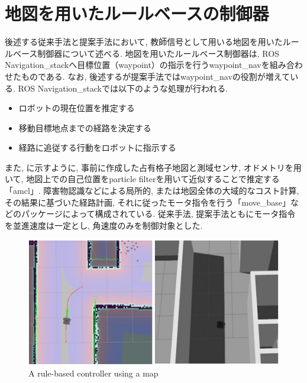 
\section{地図を用いたルールベースの制御器}
後述する従来手法と提案手法において, 教師信号として用いる地図を用いたルールベース制御器について述べる. 地図を用いたルールベース制御器は, ROS Navigation\_stack\cite{navigation:online}へ目標位置（waypoint）の指示を行うwaypoint\_nav\cite{waypoint_nav:online}を組み合わせたものである. なお, 後述するが提案手法ではwaypoint\_navの役割が増えている. ROS Navigation\_stackでは以下のような処理が行われる. 

\begin{itemize}
  \item ロボットの現在位置を推定する
  \item 移動目標地点までの経路を決定する
  \item 経路に追従する行動をロボットに指示する
\end{itemize}

また, に示すように, 事前に作成した占有格子地図と測域センサ, オドメトリを用いて, 地図上での自己位置をparticle filterを用いて近似することで推定する「amcl」. 障害物認識などによる局所的, または地図全体の大域的なコスト計算, その結果に基づいた経路計画, それに従ったモータ指令を行う「move\_base」などのパッケージによって構成されている. 従来手法, 提案手法ともにモータ指令を並進速度は一定とし, 角速度のみを制御対象とした.

\vspace{1cm}

\begin{figure}[hbtp]
  \centering
 \includegraphics[keepaspectratio, scale=0.5]
      {images/rule-based.png}
 \caption{A rule-based controller using a map}
 \label{Fig:navigation}
\end{figure}

\newpage